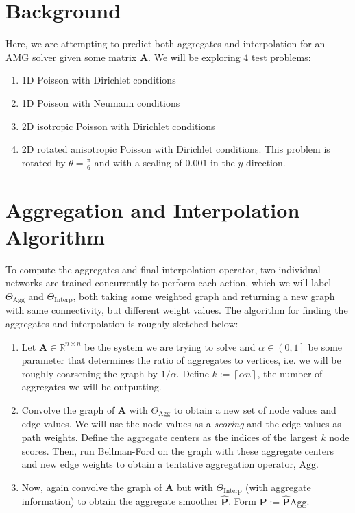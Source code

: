 \documentclass{article}
\newcommand{\mat}[1]{\bm{{#1}}}
\newcommand{\ceil}[1]{\left\lceil #1 \right\rceil}
\begin{document}
\section{Background}
Here, we are attempting to predict both aggregates and interpolation for an AMG solver given some matrix $\mat{A}$.  We will be exploring 4 test problems:
\begin{enumerate}
\item 1D Poisson with Dirichlet conditions
\item 1D Poisson with Neumann conditions
\item 2D isotropic Poisson with Dirichlet conditions
\item 2D rotated anisotropic Poisson with Dirichlet conditions.  This problem is rotated by $\theta=\frac{\pi}{6}$ and with a scaling of $0.001$ in the $y$-direction.
\end{enumerate}

\section{Aggregation and Interpolation Algorithm}
To compute the aggregates and final interpolation operator, two individual networks are trained concurrently to perform each action, which we will label $\Theta_{\text{Agg}}$ and $\Theta_{\text{Interp}}$, both taking some weighted graph and returning a new graph with same connectivity, but different weight values.  The algorithm for finding the aggregates and interpolation is roughly sketched below:
\begin{enumerate}
\item Let $\mat{A} \in \mathbb{R}^{n \times n}$ be the system we are trying to solve and $\alpha \in \left(0, 1\right]$ be some parameter that determines the ratio of aggregates to vertices, i.e. we will be roughly coarsening the graph by $1/\alpha$.  Define $k := \ceil{\alpha n}$, the number of aggregates we will be outputting.
\item Convolve the graph of $\mat{A}$ with $\Theta_{\text{Agg}}$ to obtain a new set of node values and edge values.  We will use the node values as a \textit{scoring} and the edge values as path weights.  Define the aggregate centers as the indices of the largest $k$ node scores.  Then, run Bellman-Ford on the graph with these aggregate centers and new edge weights to obtain a tentative aggregation operator, $\text{Agg}$.
\item Now, again convolve the graph of $\mat{A}$ but with $\Theta_{\text{Interp}}$ (with aggregate information) to obtain the aggregate smoother $\mat{\hat{P}}$.  Form $\mat{P} := \mat{\hat{P}}\text{Agg}$.
\end{enumerate}
\end{document}
